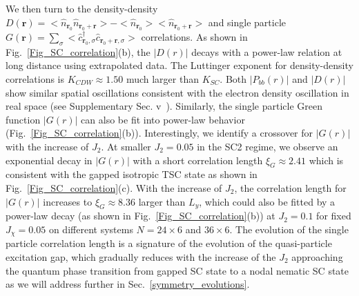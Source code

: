 \documentclass[aps,prx,reprint,superscriptaddress,showpacs]{revtex4-2}
\newcommand{\oim}[1]{{\color{blue} #1}}
\begin{document}
We then turn to the density-density  $D(\mathbf{r})=<\widehat{n}_{\mathbf{r}_{0}} \widehat{n}_{\mathbf{r}_{0}+ \mathbf{r}}>-<\widehat{n}_{\mathbf{r}_{0}}><\widehat{n}_{\mathbf{r}_{0}+ \mathbf{r}} >$ and single particle $G(\mathbf{r})=\sum _{\sigma }< \widehat{c}^{\dagger }_{\mathbf{r}_{0},\sigma } \widehat{c}_{\mathbf{r}_{0}+\mathbf{r},\sigma }>$ correlations. As shown in Fig.~\ref{Fig_SC_correlation}(b), the $\left |D(r) \right |$ decays with a power-law relation at long distance  using extrapolated data. The Luttinger exponent for density-density correlations is $K_{CDW}\approx 1.50$ much larger than $K_{SC}$. %
Both   $\left | P_{bb}(r) \right |$  and  $\left |D(r) \right |$ show similar spatial oscillations consistent with the  electron  density  oscillation  in  real  space (see Supplementary Sec. v~\cite{SuppMaterial}).
Similarly, the single particle Green function $\left |G(r)\right |$ can also be fit into power-law behavior  (Fig.~\ref{Fig_SC_correlation}(b)).
Interestingly, we identify a crossover for $\left |G(r)\right |$ with the increase of $J_{2}$. At smaller $J_{2}=0.05$ in the SC2 regime, we observe an exponential decay in $\left |G(r)\right |$ with a short correlation length $\xi_G\approx 2.41$ which is consistent with the gapped isotropic TSC state as shown in Fig.~\ref{Fig_SC_correlation}(c). With the increase of $J_{2}$, the correlation length for $\left |G(r)\right |$ increases to $\xi_G\approx 8.36$ larger than $L_{y}$, which could also be fitted by a power-law decay (as shown in Fig.~\ref{Fig_SC_correlation}(b)) at $J_{2}=0.1$ for fixed  $J_{\chi}=0.05$ on different systems $N=24\times6$ and $36\times 6$.
The evolution of the single particle correlation length is a signature of the evolution of the quasi-particle excitation gap, which gradually reduces
with the increase of the $J_{2}$ approaching the quantum phase transition \oim{ from gapped SC state to a nodal nematic SC state as we will address further in Sec.~\ref{symmetry_evolutions}.}
\end{document}
